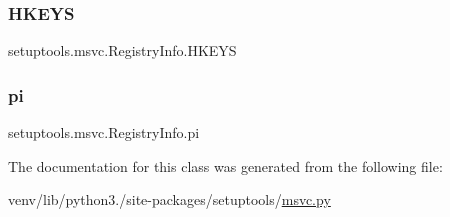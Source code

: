 \subsubsection{\texorpdfstring{H\+K\+E\+YS}{HKEYS}}
{\footnotesize\ttfamily setuptools.\+msvc.\+Registry\+Info.\+H\+K\+E\+YS\hspace{0.3cm}{\ttfamily [static]}}

\mbox{\label{classsetuptools_1_1msvc_1_1RegistryInfo_aa8ed2489936d70edee47f07fdc8820a7}} 
\subsubsection{\texorpdfstring{pi}{pi}}
{\footnotesize\ttfamily setuptools.\+msvc.\+Registry\+Info.\+pi}



The documentation for this class was generated from the following file\+:\begin{DoxyCompactItemize}
\item 
venv/lib/python3./site-\/packages/setuptools/\hyperlink{msvc_8py}{msvc.\+py}\end{DoxyCompactItemize}
